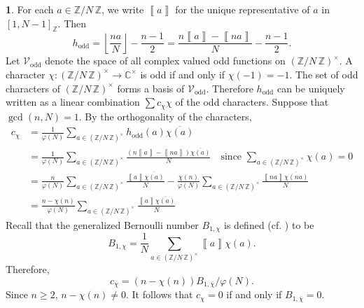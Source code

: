 \documentclass{amsart}[11pt]
\theoremstyle{definition}
\newtheorem{sect}[thm]{}
\numberwithin{equation}{section}
\theoremstyle{notitle}
\begin{document}
\begin{sect}\label{sec:fourier_expansion}
For each $a\in {\mathbb{Z}/ {N}\, \mathbb{Z}}$, we write
${\left\llbracket {a} \right\rrbracket}$ for the unique representative of $a$ in $[1, N-1]_{\mathbb{Z}}$. Then 
\[h_{\mathrm{odd}}={\left\lfloor {\frac{na}{N}} \right\rfloor}-\frac{n-1}{2}=
\frac{n{\left\llbracket {a} \right\rrbracket}-{\left\llbracket {na} \right\rrbracket}}{N}-\frac{n-1}{2}.\] Let ${\mathscr{V}}_{\mathrm{odd}}$ denote the
space of all complex valued odd functions on ${(\mathbb{Z}/ {N}\, \mathbb{Z})^\times}$. A character
$\chi: {(\mathbb{Z}/ {N}\, \mathbb{Z})^\times}\to {\mathbb{C}}^\times$ is odd if and only if $\chi(-1)=-1$.
The set of odd characters of ${(\mathbb{Z}/ {N}\, \mathbb{Z})^\times}$ forms a basis of
${\mathscr{V}}_{\mathrm{odd}}$. Therefore $h_{\mathrm{odd}}$ can be uniquely written as a linear
combination $\sum c_\chi \chi$ of the odd characters. Suppose that
$\gcd(n,N)=1$.  By the orthogonality of the characters,
  \[
  \begin{split}
    c_\chi&= \frac{1}{\varphi(N)}\sum_{a\in {(\mathbb{Z}/ {N}\, \mathbb{Z})^\times}}
    h_{\mathrm{odd}}(a)\overline{\chi(a)} \\
    &=\frac{1}{\varphi(N)}\sum_{a\in {(\mathbb{Z}/ {N}\, \mathbb{Z})^\times}}
    \frac{(n{\left\llbracket {  a} \right\rrbracket}-{\left\llbracket {  na} \right\rrbracket})\overline{\chi(a)}}{N} \quad \text{
      since } \sum_{a\in {(\mathbb{Z}/ {N}\, \mathbb{Z})^\times}} \chi(a)=0\\
    &=\frac{n}{\varphi(N)}\sum_{a\in {(\mathbb{Z}/ {N}\, \mathbb{Z})^\times}}
    \frac{{\left\llbracket {  a} \right\rrbracket}\overline{\chi(a)}}{N}-\frac{\chi(n)}{\varphi(N)}\sum_{a\in {(\mathbb{Z}/ {N}\, \mathbb{Z})^\times}}
    \frac{{\left\llbracket {  na} \right\rrbracket}\overline{\chi(na)}}{N}\\
    &=\frac{n-\chi(n)}{\varphi(N)}\sum_{a\in {(\mathbb{Z}/ {N}\, \mathbb{Z})^\times}}
    \frac{{\left\llbracket {  a} \right\rrbracket}\overline{\chi(a)}}{N}
  \end{split}
\] 
Recall that the generalized Bernoulli number 
$B_{1, \chi}$ is defined (cf. \cite[Chapter 4]{MR1421575}) to be 
\[ B_{1, \chi}=\frac{1}{N} \sum_{a\in {(\mathbb{Z}/ {N}\, \mathbb{Z})^\times}} {\left\llbracket {a} \right\rrbracket}\chi(a).\]
Therefore, 
\begin{equation}
  \label{eq:fourier}
  c_\chi=(n-\chi(n))B_{1,\bar{\chi}}/\varphi(N).
\end{equation}
Since $n \geq 2$, $n-\chi(n)\neq 0$. It follows that $c_\chi=0$ if and
only if $B_{1, \bar{\chi}}=0$.
\end{sect}
\end{document}
